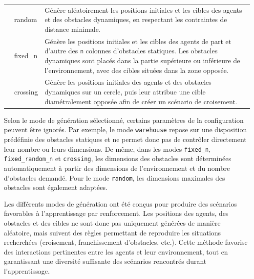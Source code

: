 \begin{table}[h]
\begin{tabularx}{\textwidth}{>{\ttfamily\small}l >{\ttfamily\small}l X}
        \midrule

        \multirow{3}{*}{agent\_mode}
                                        & random
                                        & Génère aléatoirement les positions initiales et les cibles des agents et des obstacles dynamiques, en respectant les contraintes de distance minimale.                                                                                                                   \\

                                        & fixed\_n
                                        & Génère les positions initiales et les cibles des agents de part et d'autre des \texttt{n} colonnes d'obstacles statiques. Les obstacles dynamiques sont placés dans la partie supérieure ou inférieure de l'environnement, avec des cibles situées dans la zone opposée. \\

                                        & crossing
                                        & Génère les positions initiales des agents et des obstacles dynamiques sur un cercle, puis leur attribue une cible diamétralement opposée afin de créer un scénario de croisement.                                                                                        \\

        \bottomrule
    \end{tabularx}
\end{table}

\noindent Selon le mode de génération sélectionné, certains paramètres de la configuration peuvent être ignorés. Par exemple, le mode \texttt{warehouse} repose sur une disposition prédéfinie des obstacles statiques et ne permet donc pas de contrôler directement leur nombre ou leurs dimensions. De même, dans les modes \texttt{fixed\_n}, \texttt{fixed\_random\_n} et \texttt{crossing}, les dimensions des obstacles sont déterminées automatiquement à partir des dimensions de l'environnement et du nombre d'obstacles demandé. Pour le mode \texttt{random}, les dimensions maximales des obstacles sont également adaptées.

\begin{tcolorbox}[colback=YellowGreen!5,colframe=YellowGreen,title=Remarque]
    Les différents modes de génération ont été conçus pour produire des scénarios favorables à l'apprentissage par renforcement. Les positions des agents, des obstacles et des cibles ne sont donc pas uniquement générées de manière aléatoire, mais suivent des règles permettant de reproduire les situations recherchées (croisement, franchissement d'obstacles, etc.). Cette méthode favorise des interactions pertinentes entre les agents et leur environnement, tout en garantissant une diversité suffisante des scénarios rencontrés durant l'apprentissage.
\end{tcolorbox}


